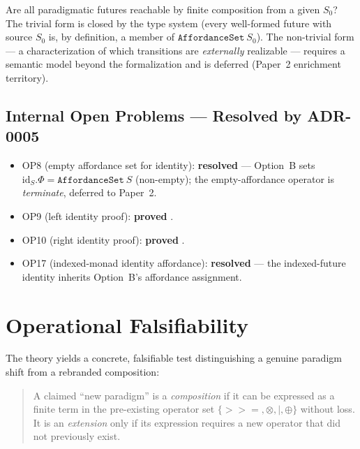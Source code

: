\documentclass[11pt,a4paper]{article}
\newcommand{\seqBind}{\mathbin{>>=}}
\newcommand{\parTensor}{\otimes}
\newcommand{\fork}{\mathbin{|}}
\newcommand{\merge}{\oplus}
\newcommand{\id}{\text{id}}
\begin{document}
Are all paradigmatic futures reachable by finite composition from a given
$S_0$? The trivial form is closed by the type system (every well-formed future
with source $S_0$ is, by definition, a member of $\texttt{AffordanceSet}~S_0$).
The non-trivial form --- a characterization of which transitions are
\emph{externally} realizable --- requires a semantic model beyond the
formalization and is deferred (Paper~2 enrichment territory).

\subsection{Internal Open Problems — \textbf{Resolved by ADR-0005}}

\begin{itemize}
\item OP8 (empty affordance set for identity): \textbf{resolved} ---
  Option~B sets $\id_S.\Phi = \texttt{AffordanceSet}~S$ (non-empty); the
  empty-affordance operator is \emph{terminate}, deferred to Paper~2.
\item OP9 (left identity proof): \textbf{proved}
  .
\item OP10 (right identity proof): \textbf{proved}
  .
\item OP17 (indexed-monad identity affordance): \textbf{resolved} ---
  the indexed-future identity inherits Option~B's affordance assignment.
\end{itemize}

\section{Operational Falsifiability}

The theory yields a concrete, falsifiable test distinguishing a genuine
paradigm shift from a rebranded composition:

\begin{quote}
A claimed ``new paradigm'' is a \emph{composition} if it can be expressed as a
finite term in the pre-existing operator set
$\{\seqBind, \parTensor, \fork, \merge\}$ without loss. It is an
\emph{extension} only if its expression requires a new operator that did not
previously exist.
\end{quote}
\end{document}
